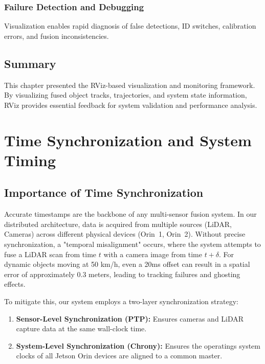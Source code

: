 \documentclass[12pt,a4paper]{report}
\begin{document}
\subsection{Failure Detection and Debugging}
Visualization enables rapid diagnosis of false detections, ID switches, calibration errors, and fusion inconsistencies.

\section{Summary}
This chapter presented the RViz-based visualization and monitoring framework. By visualizing fused object tracks, trajectories, and system state information, RViz provides essential feedback for system validation and performance analysis.

\chapter{Time Synchronization and System Timing}

\section{Importance of Time Synchronization}
Accurate timestamps are the backbone of any multi-sensor fusion system. In our distributed architecture, data is acquired from multiple sources (LiDAR, Cameras) across different physical devices (Orin~1, Orin~2). Without precise synchronization, a "temporal misalignment" occurs, where the system attempts to fuse a LiDAR scan from time $t$ with a camera image from time $t + \delta$. For dynamic objects moving at 50 km/h, even a 20ms offset can result in a spatial error of approximately 0.3 meters, leading to tracking failures and ghosting effects.

To mitigate this, our system employs a two-layer synchronization strategy:
\begin{enumerate}
    \item \textbf{Sensor-Level Synchronization (PTP):} Ensures cameras and LiDAR capture data at the same wall-clock time.
    \item \textbf{System-Level Synchronization (Chrony):} Ensures the operatings system clocks of all Jetson Orin devices are aligned to a common master.
\end{enumerate}
\end{document}
